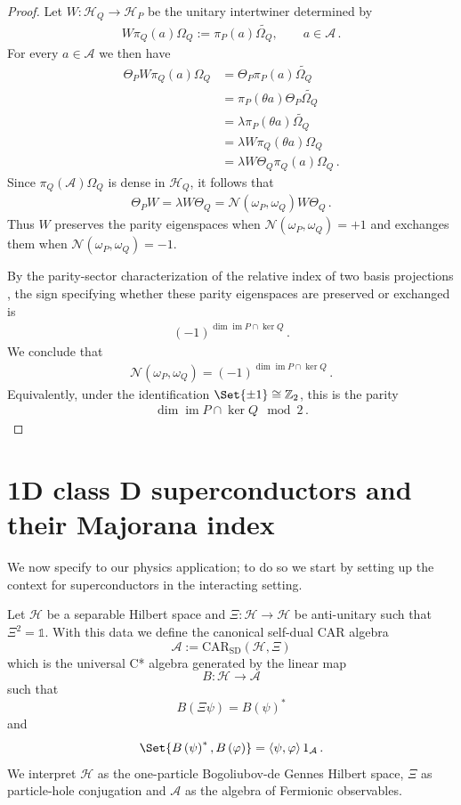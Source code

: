 \documentclass[a4paper,10pt]{article}
\numberwithin{equation}{section}
\theoremstyle{plain}
\theoremstyle{plain}
\theoremstyle{plain}
\theoremstyle{plain}
\theoremstyle{plain}
\theoremstyle{remark}
\theoremstyle{definition}
\newcommand{\ZZ}{\mathbb{Z}}
\newcommand{\calA}{\mathcal{A}}
\newcommand{\calN}{\mathcal{N}}
\newcommand{\calH}{\mathcal{H}}
\newcommand{\Id}{\mathds{1}}
\newcommand{\im}{\operatorname{im}}
\newcommand{\eq}[1]{\begin{align*}#1\end{align*}}
\newcommand{\eql}[1]{\begin{align}#1\end{align}}
\newcommand{\br}[1]{\left(#1\right)}
\begin{document}
\begin{proof}
Let $W:\calH_Q\to\calH_P$ be the unitary intertwiner determined by
\eql{
    W\pi_Q(a)\Omega_Q
    :=
    \pi_P(a)\widetilde{\Omega_Q},
    \qquad a\in\calA\,.
}
For every $a\in\calA$ we then have
\eq{
    \Theta_PW\pi_Q(a)\Omega_Q
    &=
    \Theta_P\pi_P(a)\widetilde{\Omega_Q}\\
    &=
    \pi_P(\theta a)\Theta_P\widetilde{\Omega_Q}\\
    &=
    \lambda\pi_P(\theta a)\widetilde{\Omega_Q}\\
    &=
    \lambda W\pi_Q(\theta a)\Omega_Q\\
    &=
    \lambda W\Theta_Q\pi_Q(a)\Omega_Q\,.
}
Since $\pi_Q(\calA)\Omega_Q$ is dense in $\calH_Q$, it follows that
\eql{
    \Theta_PW
    =
    \lambda W\Theta_Q
    =
    \calN(\omega_P,\omega_Q)W\Theta_Q\,.
}
Thus $W$ preserves the parity eigenspaces when
$\calN(\omega_P,\omega_Q)=+1$ and exchanges them when
$\calN(\omega_P,\omega_Q)=-1$.

By the parity-sector characterization of the relative index of two
basis projections
\cite[Theorem~1 (b) and (c)]{AzaMussnichReyesLega2022StateIndex}, the
sign specifying whether these parity eigenspaces are preserved or
exchanged is
\eql{
    \br{-1}^{\dim\im P\cap\ker Q}\,.
}
We conclude that
\eql{
    \calN(\omega_P,\omega_Q)
    =
    \br{-1}^{\dim\im P\cap\ker Q}\,.
}
Equivalently, under the identification
$\Set{\pm1}\cong\ZZ_2$, this is the parity
\eql{
    \dim\im P\cap\ker Q\mod 2\,.
}
\end{proof}


\section{1D class D superconductors and their Majorana index}
\label{sec:Majorana index}

We now specify to our physics application; to do so we start by setting up the context for superconductors in the interacting setting.

Let $\mathcal{H}$ be a separable Hilbert space and $\Xi:\mathcal{H}\to\mathcal{H}$
be anti-unitary such that $\Xi^{2}=\Id$. With this data we define the canonical
self-dual CAR algebra \cite{Araki1970QuasifreeCAR} 
\[
\mathcal{A}:=\text{CAR}_{\text{SD}}\left(\mathcal{H},\Xi\right)
\]
which is the universal C* algebra generated by the linear map
\[
B:\mathcal{H}\to\mathcal{A}
\]
such that 
\[
B\left(\Xi\psi\right)=B\left(\psi\right)^{\ast}
\]
and 
\[
\Set{B\left(\psi\right)^{\ast},B\left(\varphi\right)}=\left\langle \psi,\varphi\right\rangle 1_\calA\,.
\] We interpret $\calH$ as the one-particle Bogoliubov-de Gennes Hilbert space, $\Xi$ as particle-hole conjugation and $\calA$ as the algebra of Fermionic observables.
\end{document}
